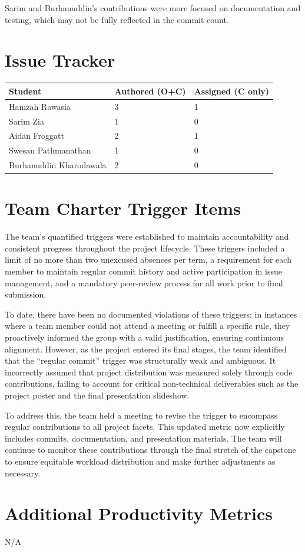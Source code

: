 \documentclass{article}
\begin{document}
Sarim and Burhanuddin's contributions were more focused on documentation and testing, which may not be fully reflected in the commit count.

\section{Issue Tracker}

\begin{table}[H]
\centering
\begin{tabular}{lll}
\toprule
\textbf{Student} & \textbf{Authored (O+C)} & \textbf{Assigned (C only)}\\
\midrule
Hamzah Rawasia & 3 & 1 \\
Sarim Zia & 1 & 0 \\
Aidan Froggatt & 2 & 1 \\
Swesan Pathmanathan & 1 & 0 \\
Burhanuddin Kharodawala & 2 & 0 \\
\bottomrule
\end{tabular}
\end{table}

\section{Team Charter Trigger Items}
The team's quantified triggers were established to maintain accountability and consistent progress throughout the project lifecycle.
 These triggers included a limit of no more than two unexcused absences per term, a requirement for each member to maintain regular
  commit history and active participation in issue management, and a mandatory peer-review process for all work prior to final submission. 

To date, there have been no documented violations of these triggers; in instances where a team member could not attend a meeting or fulfill 
a specific rule, they proactively informed the group with a valid justification, ensuring continuous alignment. However, as the project entered its
 final stages, the team identified that the ``regular commit'' trigger was structurally weak and ambiguous. It incorrectly assumed that project distribution
  was measured solely through code contributions, failing to account for critical non-technical deliverables such as the project poster and the final presentation slideshow. 

To address this, the team held a meeting to revise the trigger to encompass regular contributions to all project facets. This updated metric now explicitly includes commits,
 documentation, and presentation materials. The team will continue to monitor these contributions through the final stretch of the capstone to ensure equitable workload distribution
  and make further adjustments as necessary.
\section{Additional Productivity Metrics}
N/A
\end{document}
